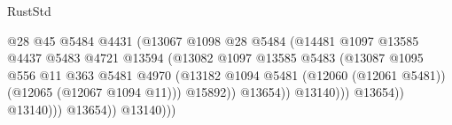 \begin{lexlean}{RustStd}
\begin{coremodule}
                                                          @28
                                                          @45
                                                          @5484
                                                          @4431
                                                          (@13067
                                                            @1098
                                                            @28
                                                            @5484
                                                            (@14481
                                                              @1097
                                                              @13585
                                                              @4437
                                                              @5483
                                                              @4721
                                                              @13594
                                                              (@13082
                                                                @1097
                                                                @13585
                                                                @5483
                                                                (@13087
                                                                  @1095
                                                                  @556
                                                                  @11
                                                                  @363
                                                                  @5481
                                                                  @4970
                                                                  (@13182
                                                                    @1094
                                                                    @5481
                                                                    (@12060 (@12061 @5481))
                                                                    (@12065 (@12067 @1094 @11)))
                                                                  @15892))
                                                              @13654))
                                                          @13140)))
                                                    @13654))
                                                @13140)))
                                          @13654))
                                      @13140)))

\end{coremodule}
\end{lexlean}
